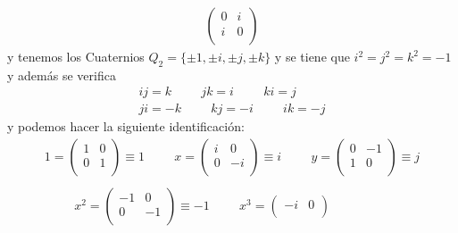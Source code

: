 \begin{ejemplo}
\begin{enumerate}
\begin{gather*}
            \begin{pmatrix}
                0 & i\\
                i & 0\\
            \end{pmatrix}
        \end{gather*}
        y tenemos los Cuaternios $Q_2=\{\pm 1, \pm i, \pm j, \pm k\}$ y se tiene que $i^2=j^2=k^2=-1$ y además se verifica
        \begin{gather*}
            ij=k \hspace{1cm} jk=i \hspace{1cm} ki=j\\
            ji=-k \hspace{1cm} kj=-i \hspace{1cm} ik=-j
        \end{gather*}
        y podemos hacer la siguiente identificación:
        \begin{gather*}
            1 = 
            \begin{pmatrix}
                1 & 0\\
                0 & 1\\
            \end{pmatrix} \equiv 1
            \hspace{1cm}
            x = 
            \begin{pmatrix}
                i & 0\\
                0 & -i\\
            \end{pmatrix} \equiv i
            \hspace{1cm}
            y = 
            \begin{pmatrix}
                0 & -1\\
                1 & 0\\
            \end{pmatrix} \equiv j \\\\
            \hspace{1cm}
            x^2 = 
            \begin{pmatrix}
                -1 & 0\\
                0 & -1\\
            \end{pmatrix} \equiv -1
            \hspace{1cm}
            x^3 = 
            \begin{pmatrix}
                -i & 0\\

\end{pmatrix}
\end{gather*}
\end{enumerate}
\end{ejemplo}
